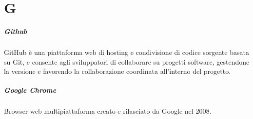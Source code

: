 \chapter{G}

\paragraph*{Github}
GitHub è una piattaforma web di hosting e condivisione di codice sorgente  basata su Git,  e consente agli sviluppatori di collaborare su progetti software, gestendone la versione e favorendo la collaborazione coordinata all'interno del progetto.

\paragraph*{Google Chrome}
Browser web multipiattaforma creato e rilasciato da Google nel 2008.